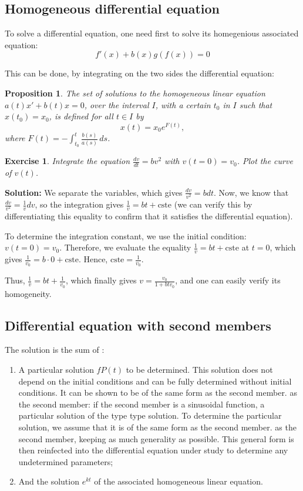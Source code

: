 \documentclass[french,12pt,a4paper]{book}
\newtheorem{exo}{Exercise}[chapter]
\newtheorem{prop}{Proposition}[chapter]
\numberwithin{equation}{chapter}
\begin{document}
\subsection{Homogeneous differential equation}

To solve a differential equation, one need first to solve its homegenious associated equation:
\begin{equation}
f'(x) +  b(x)g(f(x)) =0
\end{equation}

This can be done, by integrating on the two sides the differential equation:

\begin{prop}
The set of solutions to the homogeneous linear equation $a(t)x' + b(t)x = 0$, 
over the interval \(I\), with a certain \(t_0\) in \(I\) such that \(x(t_0) = x_0\), is defined for all \(t \in I\) by
\[x(t) = x_0 e^{F(t)},\]
where $F(t) = - \int_{t_0}^{t} \frac{b(s)}{a(s)} \, ds$.
\end{prop}

\begin{exo}
Integrate the equation $\frac{dv}{dt} = bv^2$ with $v(t = 0) = v_0$. Plot the curve of $v(t)$.
\end{exo}

\textbf{Solution:} We separate the variables, which gives $\frac{dv}{v^2} = bdt$. Now, we know that $\frac{dv}{v^2} = \frac{1}{v}dv$, so the integration gives $\frac{1}{v} = bt + \text{cste}$ (we can verify this by differentiating this equality to confirm that it satisfies the differential equation).

To determine the integration constant, we use the initial condition: $v(t = 0) = v_0$. Therefore, we evaluate the equality $\frac{1}{v} = bt + \text{cste}$ at $t = 0$, which gives $\frac{1}{v_0} = b \cdot 0 + \text{cste}$. Hence, $\text{cste} = \frac{1}{v_0}$.

Thus, $\frac{1}{v} = bt + \frac{1}{v_0}$, which finally gives $v = \frac{v_0}{1 + btv_0}$, and one can easily verify its homogeneity.

\subsection{Differential equation with second members}

The solution is the sum of :
\begin{enumerate}
\item A particular solution $f P (t)$ to be determined. This solution does not depend on the initial conditions and
can be fully determined without initial conditions. It can be shown to be of the same form as the second member.
as the second member: if the second member is a sinusoidal function, a particular solution of the type
type solution. To determine the particular solution, we assume that it is of the same form as the second member.
as the second member, keeping as much generality as possible. This general form is then reinfected into
the differential equation under study to determine any undetermined parameters;
\item And the solution $e^{kt}$ of the associated homogeneous linear equation.
\end{enumerate}
\end{document}
